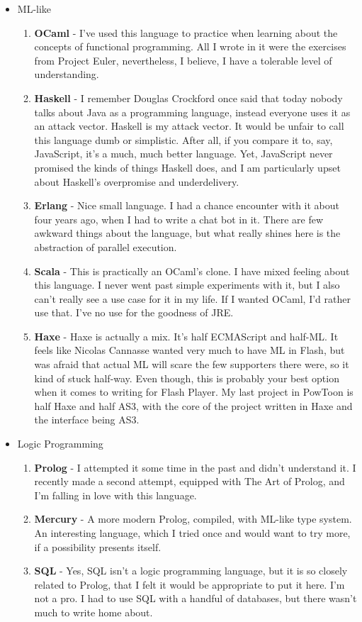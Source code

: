\documentclass[oneside]{memoir}
\begin{document}
\begin{itemize}
\item ML-like
\begin{enumerate}
\item \textbf{OCaml} - I've used this language to practice when learning about the
concepts of functional programming.  All I wrote in it were the exercises
from Project Euler, nevertheless, I believe, I have a tolerable level of
understanding.
\item \textbf{Haskell} - I remember Douglas Crockford once said that today nobody
talks about Java as a programming language, instead everyone uses it as
an attack vector.  Haskell is my attack vector.  It would be unfair to
call this language dumb or simplistic.  After all, if you compare it to,
say, JavaScript, it's a much, much better language.  Yet, JavaScript
never promised the kinds of things Haskell does, and I am particularly
upset about Haskell's overpromise and underdelivery.
\item \textbf{Erlang} - Nice small language.  I had a chance encounter with it about
four years ago, when I had to write a chat bot in it.  There are few
awkward things about the language, but what really shines here is the
abstraction of parallel execution.
\item \textbf{Scala} - This is practically an OCaml's clone.  I have mixed feeling about
this language.  I never went past simple experiments with it, but I also
can't really see a use case for it in my life.  If I wanted OCaml, I'd
rather use that.  I've no use for the goodness of JRE.
\item \textbf{Haxe} - Haxe is actually a mix.  It's half ECMAScript and half-ML.  It
feels like Nicolas Cannasse wanted very much to have ML in Flash, but
was afraid that actual ML will scare the few supporters there were,
so it kind of stuck half-way.  Even though, this is probably your best
option when it comes to writing for Flash Player.  My last project
in PowToon is half Haxe and half AS3, with the core of the project
written in Haxe and the interface being AS3.
\end{enumerate}

\item Logic Programming
\begin{enumerate}
\item \textbf{Prolog} - I attempted it some time in the past and didn't understand it.
I recently made a second attempt, equipped with The Art of Prolog, and
I'm falling in love with this language.
\item \textbf{Mercury} - A more modern Prolog, compiled, with ML-like type system.
An interesting language, which I tried once and would want to try more,
if a possibility presents itself.
\item \textbf{SQL} - Yes, SQL isn't a logic programming language, but it is so 
closely related to Prolog, that I felt it would be appropriate to put it
here.  I'm not a pro.  I had to use SQL with a handful of databases, but
there wasn't much to write home about.
\end{enumerate}


\end{itemize}
\end{document}
